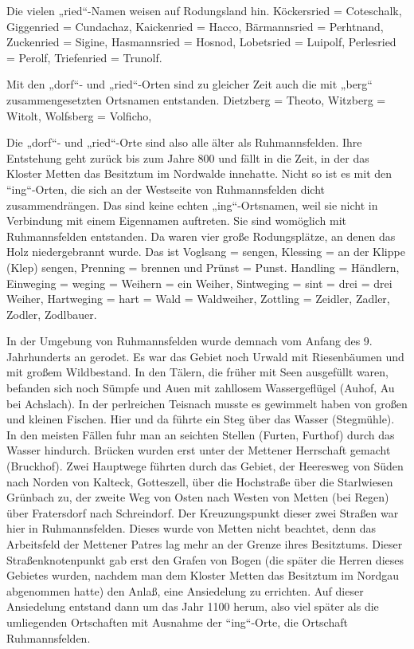 \documentclass[12pt,a4paper]{book}
\begin{document}
Die vielen „ried“-Namen weisen auf Rodungsland hin. Köckersried =
Coteschalk, Giggenried = Cundachaz, Kaickenried = Hacco, Bärmannsried =
Perhtnand, Zuckenried = Sigine, Hasmannsried = Hosnod, Lobetsried =
Luipolf, Perlesried = Perolf, Triefenried = Trunolf.

Mit den „dorf“- und „ried“-Orten sind zu gleicher Zeit auch die mit
„berg“ zusammengesetzten Ortsnamen entstanden. Dietzberg = Theoto,
Witzberg = Witolt, Wolfsberg = Volficho,

Die „dorf“- und „ried“-Orte sind also alle älter als Ruhmannsfelden.
Ihre Entstehung geht zurück bis zum Jahre 800 und fällt in die Zeit, in
der das Kloster Metten das Besitztum im Nordwalde innehatte. Nicht so
ist es mit den “ing“-Orten, die sich an der Westseite von Ruhmannsfelden
dicht zusammendrängen. Das sind keine echten „ing“-Ortsnamen, weil sie
nicht in Verbindung mit einem Eigennamen auftreten. Sie sind womöglich
mit Ruhmannsfelden entstanden. Da waren vier große Rodungsplätze, an
denen das Holz niedergebrannt wurde. Das ist Voglsang = sengen, Klessing
= an der Klippe (Klep) sengen, Prenning = brennen und Prünst = Punst.
Handling = Händlern, Einweging = weging = Weihern = ein Weiher,
Sintweging = sint = drei = drei Weiher, Hartweging = hart = Wald =
Waldweiher, Zottling = Zeidler, Zadler, Zodler, Zodlbauer.

In der Umgebung von Ruhmannsfelden wurde demnach vom Anfang des 9.
Jahrhunderts an gerodet. Es war das Gebiet noch Urwald mit Riesenbäumen
und mit großem Wildbestand. In den Tälern, die früher mit Seen
ausgefüllt waren, befanden sich noch Sümpfe und Auen mit zahllosem
Wassergeflügel (Auhof, Au bei Achslach). In der perlreichen Teisnach
musste es gewimmelt haben von großen und kleinen Fischen. Hier und da
führte ein Steg über das Wasser (Stegmühle). In den meisten Fällen fuhr
man an seichten Stellen (Furten, Furthof) durch das Wasser hindurch.
Brücken wurden erst unter der Mettener Herrschaft gemacht (Bruckhof).
Zwei Hauptwege führten durch das Gebiet, der Heeresweg von Süden nach
Norden von Kalteck, Gotteszell, über die Hochstraße über die Starlwiesen
Grünbach zu, der zweite Weg von Osten nach Westen von Metten (bei Regen)
über Fratersdorf nach Schreindorf. Der Kreuzungspunkt dieser zwei
Straßen war hier in Ruhmannsfelden. Dieses wurde von Metten nicht
beachtet, denn das Arbeitsfeld der Mettener Patres lag mehr an der
Grenze ihres Besitztums. Dieser Straßenknotenpunkt gab erst den Grafen
von Bogen (die später die Herren dieses Gebietes wurden, nachdem man dem
Kloster Metten das Besitztum im Nordgau abgenommen hatte) den Anlaß,
eine Ansiedelung zu errichten. Auf dieser Ansiedelung entstand dann um
das Jahr 1100 herum, also viel später als die umliegenden Ortschaften
mit Ausnahme der “ing“-Orte, die Ortschaft Ruhmannsfelden.
\end{document}
